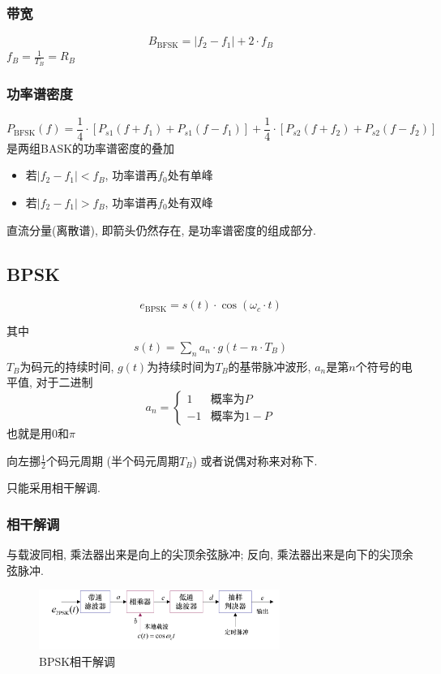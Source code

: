 \documentclass[a4paper]{report}
\begin{document}
\subsubsection{带宽}
\begin{equation}
  B_{\text{BFSK}}=\lvert f_2 - f_1 \rvert +2\cdot f_B
\end{equation}
$f_B=\frac{1}{T_B}=R_B$
\subsubsection{功率谱密度}
\begin{equation}
  P_{\text{BFSK}}(f)=\frac{1}{4}\cdot [P_{s1}(f+f_1)+P_{s1}(f-f_1)]+\frac{1}{4}\cdot [P_{s2}(f+f_2)+P_{s2}(f-f_2)]
\end{equation}
是两组BASK的功率谱密度的叠加
\begin{itemize}
  \item 若$\lvert f_2 - f_1 \rvert <f_B$, 功率谱再$f_0$处有单峰
  \item 若$\lvert f_2 - f_1 \rvert >f_B$, 功率谱再$f_0$处有双峰
\end{itemize}
直流分量(离散谱), 即箭头仍然存在, 是功率谱密度的组成部分. 
\subsection{BPSK}
\begin{equation}
  e_{\text{BPSK}}=s(t)\cdot \cos(\omega_c\cdot t)
\end{equation}

其中\begin{align*}
  s(t)=\displaystyle\sum_{n}a_n\cdot g(t-n\cdot T_B)
\end{align*}
$T_B$为码元的持续时间, $g(t)$为持续时间为$T_B$的基带脉冲波形, $a_n$是第$n$个符号的电平值, 对于二进制
\begin{equation}
  a_n=\begin{cases}
    1 &\text{概率为}P\\
    -1 &\text{概率为}1-P
  \end{cases}
\end{equation}
也就是用0和$\pi$

向左挪$\frac{1}{2}$个码元周期 (半个码元周期$T_B$) 或者说偶对称来对称下. 

只能采用相干解调. 
\subsubsection{相干解调}
与载波同相, 乘法器出来是向上的尖顶余弦脉冲; 反向, 乘法器出来是向下的尖顶余弦脉冲. 
\begin{figure}[H]
\centering
\includegraphics[width=0.7\textwidth]{bpsk_co.png}
\caption{BPSK相干解调}
\end{figure}
\end{document}
